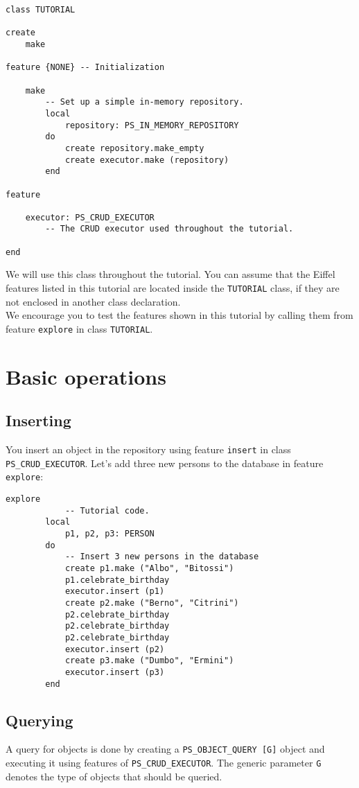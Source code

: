 \documentclass[a4paper,12pt]{report}
\begin{document}
\begin{lstlisting}[language=OOSC2Eiffel, captionpos=b, caption={The TUTORIAL class}, label={lst:tutorial_class}]
class TUTORIAL

create
	make

feature {NONE} -- Initialization

	make
		-- Set up a simple in-memory repository.
		local
			repository: PS_IN_MEMORY_REPOSITORY
		do
			create repository.make_empty
			create executor.make (repository)
		end

feature
	
	executor: PS_CRUD_EXECUTOR
		-- The CRUD executor used throughout the tutorial.

end
\end{lstlisting}
We will use this class throughout the tutorial. You can assume that the Eiffel features listed in this tutorial are located inside the \lstinline!TUTORIAL! class, if they are not enclosed in another class declaration.\\ 
We encourage you to test the features shown in this tutorial by calling them from feature \lstinline{explore} in class \lstinline!TUTORIAL!.
\chapter{Basic operations}

\section{Inserting}

You insert an object in the repository using feature \lstinline{insert} in class\\ 
\lstinline{PS_CRUD_EXECUTOR}. Let's add three new persons to the database in feature \lstinline{explore}:
\begin{lstlisting}[language=OOSC2Eiffel, captionpos=b, caption={Insertion code.}, label={lst:tutorial_insert}]
	explore
			-- Tutorial code.
		local
			p1, p2, p3: PERSON
		do
			-- Insert 3 new persons in the database
			create p1.make ("Albo", "Bitossi")
			p1.celebrate_birthday
			executor.insert (p1)
			create p2.make ("Berno", "Citrini")
			p2.celebrate_birthday
			p2.celebrate_birthday
			p2.celebrate_birthday
			executor.insert (p2)
			create p3.make ("Dumbo", "Ermini")
			executor.insert (p3)			
		end
\end{lstlisting}

\section{Querying}
\label{section:querying}
A query for objects is done by creating a \lstinline!PS_OBJECT_QUERY [G]! object and executing it using features of \lstinline!PS_CRUD_EXECUTOR!.
The generic parameter \lstinline!G! denotes the type of objects that should be queried.
\end{document}
